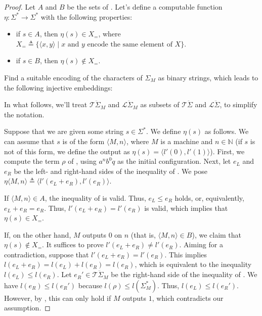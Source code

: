 \documentclass[11pt,a4paper]{amsart}
\theoremstyle{definition}
\begin{document}
\begin{proof}
  Let $A$ and $B$ be the sets of .  Let's define
  a computable function $\eta : \Sigma^* \to \Sigma^*$ with the following
  properties:
  \begin{itemize}
  \item if $s \in A$, then $\eta(s) \in X_{=}$, where
    $X_{=} \triangleq \{\langle x, y \rangle \mid \text{$x$ and $y$ encode the
      same element of $X$}\}$.
  \item if $s \in B$, then $\eta(s) \notin X_{=}$.
  \end{itemize}
  Find a suitable encoding of the characters of $ \Sigma_M$ as binary strings,
  which leads to the following injective embeddings:
  \begin{center}
  \end{center}
  In what follows, we'll treat $\mathcal{T}\ddot{\Sigma}_M$ and
  $\mathcal{L}\ddot{\Sigma}_M$ as subsets of $\mathcal{T}\ddot{\Sigma}$ and
  $\mathcal{L}\ddot{\Sigma}$, to simplify the notation.

  Suppose that we are given some string $s \in \Sigma^*$.  We define $\eta(s)$
  as follows.  We can assume that $s$ is of the form $ \langle M, n \rangle$,
  where $M$ is a machine and $n \in \mathbb{N}$ (if $s$ is not of this form, we
  define the output as $\eta(s) = \langle l'(0), l'(1)\rangle $).  First, we
  compute the term $\rho$ of , using $a^nb^0\dot{q}$ as
  the initial configuration.  Next, let $e_L$ and $e_R$ be the left- and
  right-hand sides of the inequality of .  We pose
  \( \eta\langle M , n \rangle \triangleq \langle l'(e_L+e_R),l'(e_R)\rangle.
  \)

  If $\langle M, n \rangle \in A$, the inequality of  is
  valid.  Thus, $e_L \le e_R$ holds, or, equivalently, $e_L + e_R = e_R$.  Thus,
  $l'(e_L+e_R) = l'(e_R)$ is valid, which implies that $\eta(s) \in X_{=}$.

  If, on the other hand, $M$ outputs $0$ on $n$ (that is,
  $\langle M, n \rangle \in B$), we claim that $\eta(s) \notin X_{=}$.  It
  suffices to prove $l'(e_L+e_R) \neq l'(e_R)$. Aiming for a contradiction,
  suppose that $l'(e_L+e_R) = l'(e_R)$. This implies
  $l(e_L+e_R) = l(e_L) + l(e_R) = l(e_R)$, which is equivalent to the inequality
  $l(e_L) \le l(e_R)$.  Let $e_R' \in \mathcal{T}\ddot{\Sigma}_M$ be the
  right-hand side of the inequality of .  We have
  $l(e_R) \le l(e_R')$ because $l(\rho) \le l(\Sigma_M^*)$.  Thus,
  $l(e_L) \le l(e_R')$.  However, by , this can only hold if
  $M$ outputs $1$, which contradicts our assumption.


\end{proof}
\end{document}

